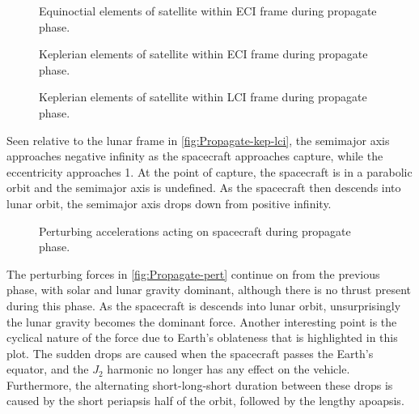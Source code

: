 \begin{figure}
\caption{Equinoctial elements of satellite within ECI frame during propagate phase.} \label{fig:Propagate-mee}
\centering
\def\svgwidth{\figurewidth}

\end{figure}

\begin{figure}
\caption{Keplerian elements of satellite within ECI frame during propagate phase.} \label{fig:Propagate-kep}
\centering
\def\svgwidth{\figurewidth}

\end{figure}

\begin{figure}
\caption{Keplerian elements of satellite within LCI frame during propagate phase.} \label{fig:Propagate-kep-lci}
\centering
\def\svgwidth{\figurewidth}

\end{figure}

Seen relative to the lunar frame in \autoref{fig:Propagate-kep-lci}, the semimajor axis approaches negative infinity as the spacecraft approaches capture, while the eccentricity approaches 1. At the point of capture, the spacecraft is in a parabolic orbit and the semimajor axis is undefined. As the spacecraft then descends into lunar orbit, the semimajor axis drops down from positive infinity.

\begin{figure}
\caption{Perturbing accelerations acting on spacecraft during propagate phase.} \label{fig:Propagate-pert}
\centering
\def\svgwidth{\figurewidth}

\end{figure}

The perturbing forces in \autoref{fig:Propagate-pert} continue on from the previous phase, with solar and lunar gravity dominant, although there is no thrust present during this phase. As the spacecraft is descends into lunar orbit, unsurprisingly the lunar gravity becomes the dominant force. Another interesting point is the cyclical nature of the force due to Earth's oblateness that is highlighted in this plot. The sudden drops are caused when the spacecraft passes the Earth's equator, and the $J_2$ harmonic no longer has any effect on the vehicle. Furthermore, the alternating short-long-short duration between these drops is caused by the short periapsis half of the orbit, followed by the lengthy apoapsis.

%


